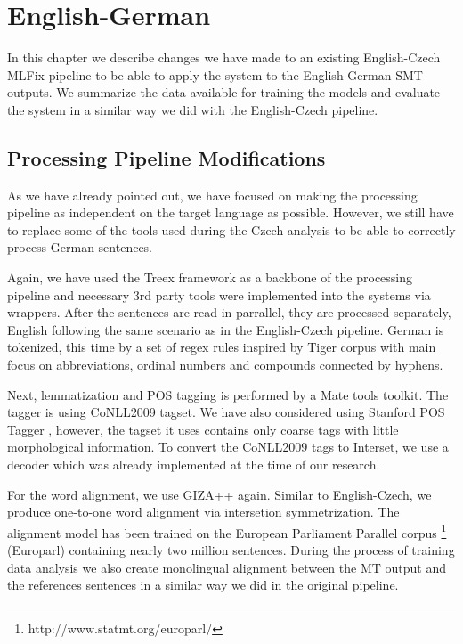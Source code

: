 \chapter{English-German}
\label{chap:german}

In this chapter we describe changes we have made to an existing
English-Czech MLFix pipeline to be able to apply the system to the English-German
SMT outputs. We summarize the data available for training the models
and evaluate the system in a similar way we did with the English-Czech
pipeline.

\section{Processing Pipeline Modifications}

As we have already pointed out, we have focused on making the processing pipeline as independent
on the target language as possible. However, we still have to replace some of the tools
used during the Czech analysis to be able to correctly process German sentences.

Again, we have used the Treex framework as a backbone of the processing pipeline and
necessary 3rd party tools were implemented into the systems via wrappers.
After the sentences are read in parrallel, they are processed separately, English
following the same scenario as in the English-Czech pipeline.
German is tokenized, this time by a set of regex rules inspired by Tiger corpus \citep{Brants2004}
with main focus on abbreviations, ordinal numbers and compounds connected by hyphens.

Next, lemmatization and POS tagging is performed by a Mate tools
toolkit. The tagger is using CoNLL2009 \citep{CoNLL-2009-ST} tagset. We have also considered using
Stanford POS Tagger \citep{Toutanova:2000:EKS:1117794.1117802},
however, the tagset it uses contains only coarse tags with little morphological information.
To convert the CoNLL2009 tags to Interset, we use a decoder which was already implemented at the
time of our research.

For the word alignment, we use GIZA++ again. Similar to English-Czech, we produce one-to-one word alignment
via intersetion symmetrization. The alignment model has been trained on the European
Parliament Parallel corpus \citep{koehn2005epc}\footnote{http://www.statmt.org/europarl/} (Europarl)
containing nearly two million sentences. During the process of training data analysis we 
also create monolingual alignment between the MT output and the references sentences
in a similar way we did in the original pipeline.


